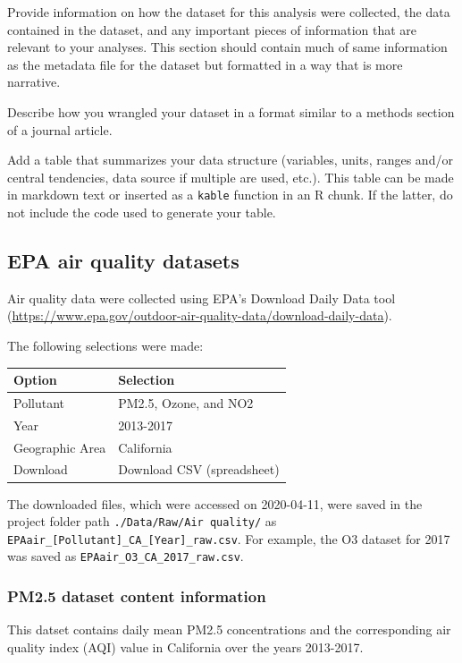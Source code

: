 \documentclass[12pt,]{article}
\begin{document}
Provide information on how the dataset for this analysis were collected,
the data contained in the dataset, and any important pieces of
information that are relevant to your analyses. This section should
contain much of same information as the metadata file for the dataset
but formatted in a way that is more narrative.

Describe how you wrangled your dataset in a format similar to a methods
section of a journal article.

Add a table that summarizes your data structure (variables, units,
ranges and/or central tendencies, data source if multiple are used,
etc.). This table can be made in markdown text or inserted as a
\texttt{kable} function in an R chunk. If the latter, do not include the
code used to generate your table.

\hypertarget{epa-air-quality-datasets}{%
\subsection{EPA air quality datasets}\label{epa-air-quality-datasets}}

Air quality data were collected using EPA's Download Daily Data tool
(\url{https://www.epa.gov/outdoor-air-quality-data/download-daily-data}).

The following selections were made:

\begin{longtable}[]{@{}ll@{}}
\toprule
Option & Selection\tabularnewline
\midrule
\endhead
Pollutant & PM2.5, Ozone, and NO2\tabularnewline
Year & 2013-2017\tabularnewline
Geographic Area & California\tabularnewline
Download & Download CSV (spreadsheet)\tabularnewline
\bottomrule
\end{longtable}

The downloaded files, which were accessed on 2020-04-11, were saved in
the project folder path \texttt{./Data/Raw/Air\ quality/} as
\texttt{EPAair\_{[}Pollutant{]}\_CA\_{[}Year{]}\_raw.csv}. For example,
the O3 dataset for 2017 was saved as
\texttt{EPAair\_O3\_CA\_2017\_raw.csv}.

\hypertarget{pm2.5-dataset-content-information}{%
\subsubsection{PM2.5 dataset content
information}\label{pm2.5-dataset-content-information}}

This datset contains daily mean PM2.5 concentrations and the
corresponding air quality index (AQI) value in California over the years
2013-2017.
\end{document}
